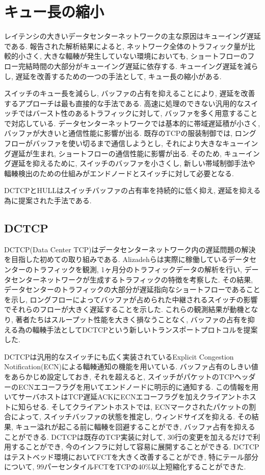 \section{キュー長の縮小}
レイテンシの大きいデータセンターネットワークの主な原因はキューイング遅延である\cite{dctcp}. 
報告された解析結果\cite{dctcp}によると, ネットワーク全体のトラフィック量が比較的小さく, 大きな輻輳が発生していない環境においても,
ショートフローのフロー完結時間の大部分がキューイング遅延に依存する. 
キューイング遅延を減らし, 遅延を改善するための一つの手法として, キュー長の縮小がある. 

スイッチのキュー長を減らし, バッファの占有を抑えることにより, 遅延を改善するアプローチは最も直接的な手法である. 
高速に処理のできない汎用的なスイッチではバースト性のあるトラフィックに対して, バッファを多く用意することで対応している. 
データセンターネットワークでは基本的に帯域遅延積が小さく, バッファが大きいと通信性能に影響が出る. 
既存のTCPの服装制御では, ロングフローがバッファを使い切るまで通信しようとし, それにより大きなキューイング遅延が生まれ,
ショートフローの通信性能に影響が出る. 
そのため, キューイング遅延を抑えるために, スイッチのバッファを小さくし,
新しい帯域制御手法や輻輳検出のための仕組みがエンドノードとスイッチに対して必要となる. 

DCTCP\cite{dctcp}とHULL\cite{hull}はスイッチバッファの占有率を持続的に低く抑え, 遅延を抑える為に提案された手法である. 

\subsection{DCTCP}
DCTCP(Data Center TCP)\cite{dctcp}はデータセンターネットワーク内の遅延問題の解決を目指した初めての取り組みである. 
Alizadehら\cite{dctcp}は実際に稼働しているデータセンターのトラフィックを観測, 1ヶ月分のトラフィックデータの解析を行い,
データセンターネットワークが生成するトラフィックの特徴を考察した. 
その結果, データセンターのトラフィックの大部分が遅延指向なショートフローであることを示し,
ロングフローによってバッファが占められた中継されるスイッチの影響でそれらのフローが大きく遅延することを示した. 
これらの観測結果が動機となり, 著者たちはスループット性能を大きく損なうことなく,
バッファの占有を抑える為の輻輳手法としてDCTCPという新しいトランスポートプロトコルを提案した. 

DCTCPは汎用的なスイッチにも広く実装されているExplicit Congestion
Notification(ECN)による輻輳通知の機能を用いている.
バッファ占有のしきい値をあらかじめ設定しておき, それを超えると,
スイッチがパケットのTCPヘッダーのECNエコーフラグを用いてエンドノードに明示的に通知する.
この情報を用いてサーバホストはTCP遅延ACKにECNエコーフラグを加えクライアントホストに知らせる. 
そしてクライアントホストでは, ECNマークされたパケットの割合によって, スイッチバッファの状態を推定し, ウィンドサイズを抑える. 
その結果, キュー溢れが起こる前に輻輳を回避することができ, バッファ占有を抑えることができる. 
DCTCPは既存のTCP実装に対して, 30行の変更を加えるだけで利用することができ, 今のインフラに対して容易に展開することができる. 
DCTCPはテストベッド環境においてFCTを大きく改善することができ, 特にテール部分について,
99パーセンタイルFCTをTCPの40\%以上短縮化することができた. 


